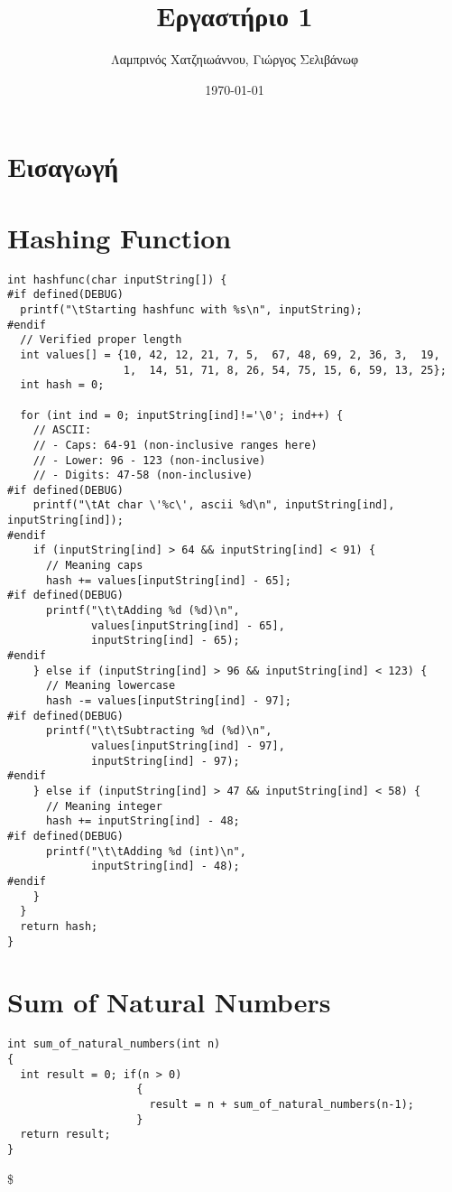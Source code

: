 \documentclass[11pt]{article}
\author{Λαμπρινός Χατζηιωάννου, Γιώργος Σελιβάνωφ}
\date{\today}
\title{Εργαστήριο 1}
\begin{document}
\maketitle
\tableofcontents

\section{Εισαγωγή}
\label{sec:org174c111}

\section{Hashing Function}
\label{sec:org298e7a2}
\begin{verbatim}
int hashfunc(char inputString[]) {
#if defined(DEBUG)
  printf("\tStarting hashfunc with %s\n", inputString);
#endif
  // Verified proper length
  int values[] = {10, 42, 12, 21, 7, 5,  67, 48, 69, 2, 36, 3,  19,
                  1,  14, 51, 71, 8, 26, 54, 75, 15, 6, 59, 13, 25};
  int hash = 0;

  for (int ind = 0; inputString[ind]!='\0'; ind++) {
    // ASCII:
    // - Caps: 64-91 (non-inclusive ranges here)
    // - Lower: 96 - 123 (non-inclusive)
    // - Digits: 47-58 (non-inclusive)
#if defined(DEBUG)
    printf("\tAt char \'%c\', ascii %d\n", inputString[ind], inputString[ind]);
#endif
    if (inputString[ind] > 64 && inputString[ind] < 91) {
      // Meaning caps
      hash += values[inputString[ind] - 65];
#if defined(DEBUG)
      printf("\t\tAdding %d (%d)\n",
             values[inputString[ind] - 65],
             inputString[ind] - 65);
#endif
    } else if (inputString[ind] > 96 && inputString[ind] < 123) {
      // Meaning lowercase
      hash -= values[inputString[ind] - 97];
#if defined(DEBUG)
      printf("\t\tSubtracting %d (%d)\n",
             values[inputString[ind] - 97],
             inputString[ind] - 97);
#endif
    } else if (inputString[ind] > 47 && inputString[ind] < 58) {
      // Meaning integer
      hash += inputString[ind] - 48;
#if defined(DEBUG)
      printf("\t\tAdding %d (int)\n",
             inputString[ind] - 48);
#endif
    }
  }
  return hash;
}

\end{verbatim}
\section{Sum of Natural Numbers}
\label{sec:org614a35a}
\begin{verbatim}
int sum_of_natural_numbers(int n)
{
  int result = 0; if(n > 0)
                    {
                      result = n + sum_of_natural_numbers(n-1);
                    }
  return result;
}
\end{verbatim}

\$
\section{}
\label{sec:orgfb161cd}
\end{document}
